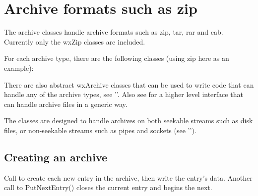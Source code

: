 
\section{Archive formats such as zip}\label{wxarc}

The archive classes handle archive formats such as zip, tar, rar and cab.
Currently only the wxZip classes are included.

For each archive type, there are the following classes (using zip here
as an example):

\begin{twocollist}\twocolwidtha{4cm}
\end{twocollist}

There are also abstract wxArchive classes that can be used to write code
that can handle any of the archive types,
see ''.
Also see  for a higher level interface that
can handle archive files in a generic way.

The classes are designed to handle archives on both seekable streams such
as disk files, or non-seekable streams such as pipes and sockets
(see '').




\subsection{Creating an archive}\label{wxarccreate}


Call  to
create each new entry in the archive, then write the entry's data.
Another call to PutNextEntry() closes the current entry and begins the next.

